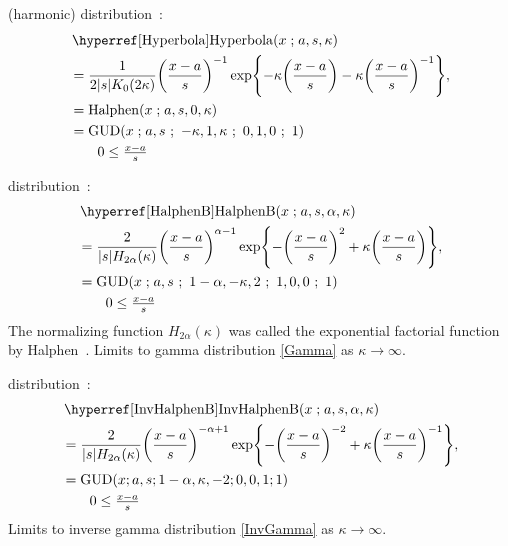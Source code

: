  (harmonic) distribution~\cite{Halphen1941,Perreault1999}:
\begin{align}
\label{Hyperbola}
&\opr{Hyperbola}(x\given a,s,\kappa) 
\\ 
&= \frac{1}{2 |s| K_0(2\kappa)} \Left(\frac{x-a}{s}\Right)^{-1} 
\exp \Left\{ -\kappa \Left(\frac{x-a}{s}\Right) -\kappa \Left(\frac{x-a}{s}\Right)^{-1} \Right\},
\checked
\notag
\\
& = \op{Halphen}(x\given a,s, 0, \kappa) 
\checked
\notag
\\
& = \op{GUD}(x\given a,s\sep -\kappa, 1 , \kappa\sep 0,1,0\sep 1) 
\checked
\notag
\\& \qquad  0 \leq \tfrac{x-a}{s}
\notag
\end{align}




 distribution~\cite{Halphen1941,Perreault1999}:
\begin{align}
\label{HalphenB}
&\opr{HalphenB}(x\given a,s, \alpha, \kappa) 
\\
&= \frac{2}{|s| H_{2 \alpha}(\kappa)} \Left(\frac{x-a}{s}\Right)^{\alpha-1} 
\exp\Left\{- \Left(\frac{x-a}{s}\Right)^{2} +\kappa \Left(\frac{x-a}{s}\Right)\Right\},
\checked
\notag
\\
& = \op{GUD}(x\given a,s\sep 1-\alpha, -\kappa,  2\sep 1,0,0\sep 1) \checked
\notag
\\& \qquad  0 \leq \tfrac{x-a}{s}
\notag
\end{align}
The normalizing function $H_{2 \alpha}(\kappa)$ was called the exponential factorial function by Halphen~\cite{Halphen1955a, Perreault1999}.
Limits to gamma distribution \eqref{Gamma} as $\kappa \rightarrow \infty$.

 distribution~\cite{Morlat1956a,Perreault1999}:
\begin{align}
\label{InvHalphenB}
&\opr{InvHalphenB}(x\given a,s, \alpha, \kappa) 
\\
&= \frac{2}{|s| H_{2\alpha}(\kappa)} \Left(\frac{x-a}{s}\Right)^{-\alpha+1} 
\exp\Left\{- \Left(\frac{x-a}{s}\Right)^{-2} +\kappa \Left(\frac{x-a}{s}\Right)^{-1}\Right\},
\checked
\notag
\\
& = \op{GUD}(x ; a,s; 1-\alpha, \kappa,  -2; 0,0,1;1) \checked
\notag
\\& \qquad  0 \leq \tfrac{x-a}{s}
\notag
\end{align}
Limits to inverse gamma distribution \eqref{InvGamma} as $\kappa \rightarrow \infty$.

